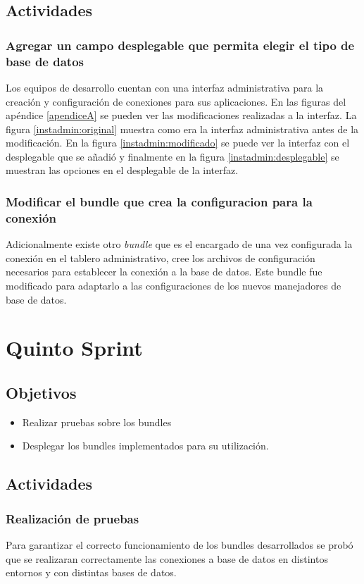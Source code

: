\subsection{Actividades}
\subsubsection{Agregar un campo desplegable que permita elegir el tipo de base de datos}
Los equipos de desarrollo cuentan con una interfaz administrativa para la creación y configuración
de conexiones para sus aplicaciones. En las figuras del apéndice \ref{apendiceA} se pueden ver las
modificaciones realizadas a la interfaz. La figura \ref{instadmin:original} muestra como era
la interfaz administrativa antes de la modificación. En la figura \ref{instadmin:modificado} se
puede ver la interfaz con el desplegable que se añadió y finalmente en la figura \ref{instadmin:desplegable}
se muestran las opciones en el desplegable de la interfaz.

\subsubsection{Modificar el bundle que crea la configuracion para la conexión}
Adicionalmente existe otro \emph{bundle} que es el encargado de una vez configurada la conexión
en el tablero administrativo, cree los archivos de configuración necesarios para establecer
la conexión a la base de datos. Este bundle fue modificado para adaptarlo a las configuraciones
de los nuevos manejadores de base de datos.

\section{Quinto Sprint}

\subsection{Objetivos}
\begin{itemize}
  \item Realizar pruebas sobre los bundles
  \item Desplegar los bundles implementados para su utilización.
\end{itemize}
\subsection{Actividades}
\subsubsection{Realización de pruebas}
Para garantizar el correcto funcionamiento de los bundles desarrollados
se probó que se realizaran correctamente las conexiones a base de datos en distintos
entornos y con distintas bases de datos.
